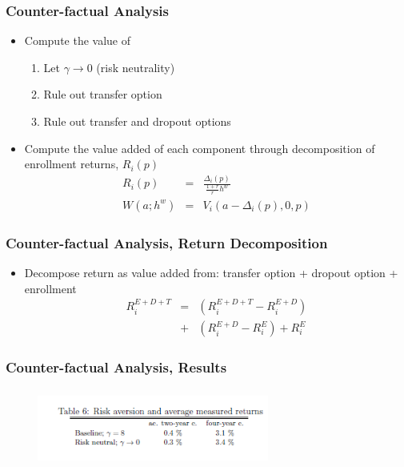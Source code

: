 \begin{frame}
		\frametitle{Counter-factual Analysis}
		\begin{itemize}
			\item Compute the value of
				\begin{enumerate}
					\item Let $\gamma \rightarrow 0$ (risk neutrality)
					\item Rule out transfer option
					\item Rule out transfer and dropout options 
				\end{enumerate}
			\item Compute the value added of each component through decomposition of enrollment returns, $R_{i}(p)$
				\begin{eqnarray}
					R_{i}(p) &=& \frac{\Delta_{i}(p)}{\frac{1+r}{r}h^w} \nonumber \\
					W(a; h^w)&=& V_{i}(a - \Delta_{i}(p), 0, p)
				\end{eqnarray}
		\end{itemize}
\end{frame}

\begin{frame}
	\frametitle{Counter-factual Analysis, Return Decomposition}
		\begin{itemize}
			\item Decompose return as value added from: transfer option + dropout option + enrollment
			\begin{eqnarray}
			R_{i}^{E+D+T} &=& (R_{i}^{E+D+T} - R_{i}^{E+D}) \nonumber \\
			              &+& (R_{i}^{E+D} - R_{i}^{E}) + R_{i}^{E}
			\end{eqnarray}
		\end{itemize}
\end{frame}

\begin{frame}
	\frametitle{Counter-factual Analysis, Results}
		\begin{figure}[H] 
				\caption*{}
				\centering
				\includegraphics[width=3in, height=1in]{Figures/T/table6.png}
		\end{figure}
\end{frame}

